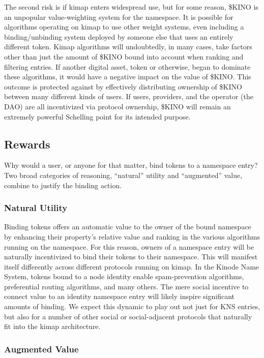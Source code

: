 \documentclass[runningheads]{llncs}
\begin{document}
The second risk is if kimap enters widespread use, but for some reason, \$KINO is an unpopular value-weighting system for the namespace.
It is possible for algorithms operating on kimap to use other weight systems, even including a binding/unbinding system deployed by someone else that uses an entirely different token.
Kimap algorithms will undoubtedly, in many cases, take factors other than just the amount of \$KINO bound into account when ranking and filtering entries.
If another digital asset, token or otherwise, began to dominate these algorithms, it would have a negative impact on the value of \$KINO.
This outcome is protected against by effectively distributing ownership of \$KINO between many different kinds of users.
If users, providers, and the operator (the DAO) are all incentivized via protocol ownership, \$KINO will remain an extremely powerful Schelling point for its intended purpose.

\subsection{Rewards}
\label{sec:kinorewards}

Why would a user, or anyone for that matter, bind tokens to a namespace entry?
Two broad categories of reasoning, ``natural'' utility and ``augmented'' value, combine to justify the binding action.

\subsubsection{Natural Utility}
\label{sec:kinoutility}

Binding tokens offers an automatic value to the owner of the bound namespace by enhancing their property's relative value and ranking in the various algorithms running on the namespace.
For this reason, owners of a namespace entry will be naturally incentivized to bind their tokens to their namespace.
This will manifest itself differently across different protocols running on kimap.
In the Kinode Name System, tokens bound to a node identity enable spam-prevention algorithms, preferential routing algorithms, and many others.
The mere social incentive to connect value to an identity namespace entry will likely inspire significant amounts of binding.
We expect this dynamic to play out not just for KNS entries, but also for a number of other social or social-adjacent protocols that naturally fit into the kimap architecture.

\subsubsection{Augmented Value}
\label{sec:kinoaugmentedvalue}
\end{document}
